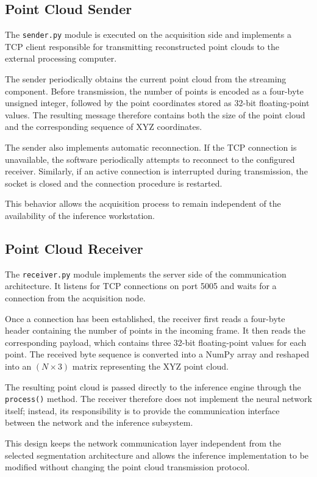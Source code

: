 \subsection{Point Cloud Sender}

The \texttt{sender.py} module is executed on the acquisition side and implements a TCP client responsible for transmitting reconstructed point clouds to the external processing computer.

The sender periodically obtains the current point cloud from the streaming component. Before transmission, the number of points is encoded as a four-byte unsigned integer, followed by the point coordinates stored as 32-bit floating-point values. The resulting message therefore contains both the size of the point cloud and the corresponding sequence of XYZ coordinates.

The sender also implements automatic reconnection. If the TCP connection is unavailable, the software periodically attempts to reconnect to the configured receiver. Similarly, if an active connection is interrupted during transmission, the socket is closed and the connection procedure is restarted.

This behavior allows the acquisition process to remain independent of the availability of the inference workstation.

\subsection{Point Cloud Receiver}

The \texttt{receiver.py} module implements the server side of the communication architecture. It listens for TCP connections on port 5005 and waits for a connection from the acquisition node.

Once a connection has been established, the receiver first reads a four-byte header containing the number of points in the incoming frame. It then reads the corresponding payload, which contains three 32-bit floating-point values for each point. The received byte sequence is converted into a NumPy array and reshaped into an $(N\times3)$ matrix representing the XYZ point cloud.

The resulting point cloud is passed directly to the inference engine through the \texttt{process()} method. The receiver therefore does not implement the neural network itself; instead, its responsibility is to provide the communication interface between the network and the inference subsystem.

This design keeps the network communication layer independent from the selected segmentation architecture and allows the inference implementation to be modified without changing the point cloud transmission protocol.

